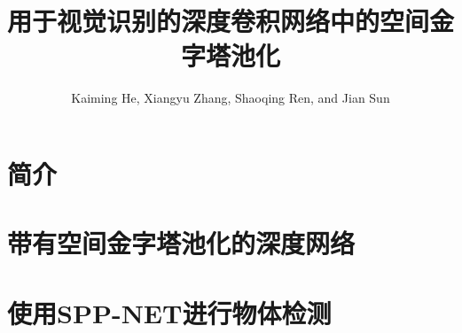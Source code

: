 \documentclass{ctexart}
\title{用于视觉识别的深度卷积网络中的空间金字塔池化}
\author{Kaiming He, Xiangyu Zhang, Shaoqing Ren, and Jian Sun}
\date{}
\begin{document}
\maketitle
\begin{abstract}
    
\end{abstract}
\section{简介}

\section{带有空间金字塔池化的深度网络}

\section{使用SPP-NET进行物体检测}

\begin{appendices}
    
\end{appendices}
\printbibliography
\end{document}
